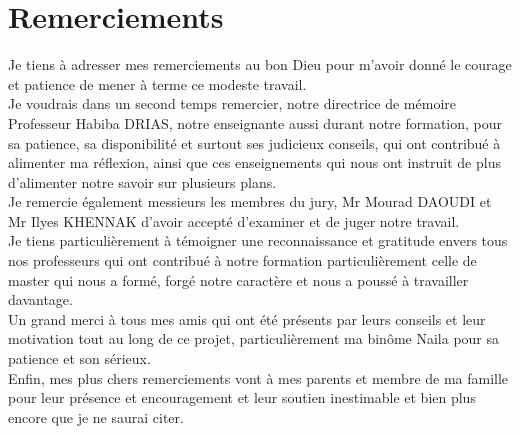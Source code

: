 \chapter*{Remerciements}


Je tiens à adresser mes remerciements au bon Dieu pour m’avoir donné le courage et patience de mener à terme ce modeste travail.\\

Je voudrais dans un second temps remercier, notre directrice de mémoire Professeur Habiba DRIAS, notre enseignante aussi durant notre formation, pour sa patience, sa disponibilité et surtout ses judicieux conseils, qui ont contribué à alimenter ma réflexion, ainsi que ces enseignements qui nous ont instruit de plus d'alimenter notre savoir sur plusieurs plans.\\

Je remercie également messieurs les membres du jury, Mr Mourad DAOUDI et Mr Ilyes KHENNAK d’avoir accepté d’examiner et de juger notre travail.\\


Je tiens particulièrement à témoigner une reconnaissance et gratitude envers tous nos professeurs qui ont contribué à notre formation particulièrement celle de master qui nous a formé, forgé notre caractère et nous a poussé à travailler davantage.\\


Un grand merci à tous mes amis qui ont été présents par leurs conseils et leur motivation tout au long de ce projet, particulièrement ma binôme Naila pour sa patience et son sérieux.\\

Enfin, mes plus chers remerciements vont à mes parents et membre de ma famille pour leur présence et encouragement et leur soutien inestimable et bien plus encore que je ne saurai citer.
